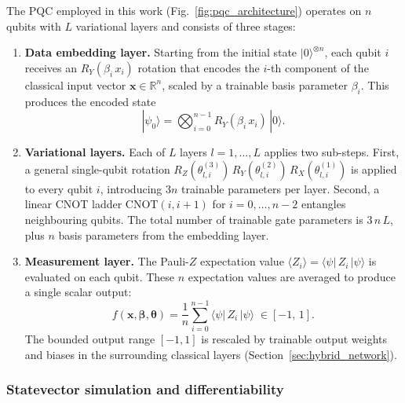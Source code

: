 The PQC employed in this work (Fig.~\ref{fig:pqc_architecture})
operates on $n$ qubits with $L$ variational layers and consists of
three stages:

\begin{enumerate}
  \item \textbf{Data embedding layer.}  Starting from the initial state
    $|0\rangle^{\otimes n}$, each qubit $i$ receives an $R_Y(\beta_i\,
    x_i)$ rotation that encodes the $i$-th component of the classical
    input vector $\mathbf{x} \in \mathbb{R}^n$, scaled by a trainable
    basis parameter $\beta_i$.  This produces the encoded state
    \begin{equation}
      |\psi_0\rangle = \bigotimes_{i=0}^{n-1}
        R_Y(\beta_i\, x_i)\,|0\rangle.
    \end{equation}

  \item \textbf{Variational layers.}  Each of $L$ layers $l = 1,
    \dots, L$ applies two sub-steps.  First, a general single-qubit
    rotation
    $R_Z(\theta^{(3)}_{l,i})\, R_Y(\theta^{(2)}_{l,i})\,
    R_X(\theta^{(1)}_{l,i})$
    is applied to every qubit $i$, introducing $3n$ trainable parameters
    per layer.  Second, a linear CNOT ladder
    $\text{CNOT}(i, i{+}1)$ for $i = 0, \dots, n{-}2$
    entangles neighbouring qubits.  The total number of trainable gate
    parameters is $3\,n\,L$, plus $n$ basis parameters from the
    embedding layer.

  \item \textbf{Measurement layer.}  The Pauli-$Z$ expectation value
    $\langle Z_i \rangle = \langle\psi|\,Z_i\,|\psi\rangle$ is
    evaluated on each qubit.  These $n$ expectation values are averaged
    to produce a single scalar output:
    \begin{equation}
      f(\mathbf{x}, \boldsymbol{\beta}, \boldsymbol{\theta})
      = \frac{1}{n} \sum_{i=0}^{n-1}
        \langle\psi|\, Z_i \,|\psi\rangle
      \;\in [-1,\, 1].
      \label{eq:pqc_output}
    \end{equation}
    The bounded output range $[-1, 1]$ is rescaled by trainable output
    weights and biases in the surrounding classical layers
    (Section~\ref{sec:hybrid_network}).
\end{enumerate}

\subsubsection{Statevector simulation and differentiability}

